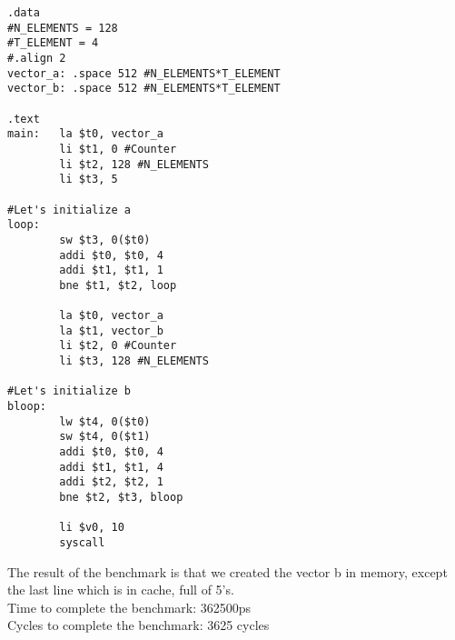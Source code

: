 \documentclass{article}
\begin{document}
\begin{lstlisting} 
.data
#N_ELEMENTS = 128
#T_ELEMENT = 4
#.align 2
vector_a: .space 512 #N_ELEMENTS*T_ELEMENT
vector_b: .space 512 #N_ELEMENTS*T_ELEMENT

.text
main: 	la $t0, vector_a
		li $t1, 0 #Counter
		li $t2, 128 #N_ELEMENTS
		li $t3, 5

#Let's initialize a
loop:	
		sw $t3, 0($t0)
		addi $t0, $t0, 4
		addi $t1, $t1, 1
		bne $t1, $t2, loop

        la $t0, vector_a
		la $t1, vector_b
		li $t2, 0 #Counter
		li $t3, 128 #N_ELEMENTS

#Let's initialize b
bloop:	
		lw $t4, 0($t0)
		sw $t4, 0($t1)
		addi $t0, $t0, 4
		addi $t1, $t1, 4
		addi $t2, $t2, 1
		bne $t2, $t3, bloop

        li $v0, 10
		syscall
\end{lstlisting}
The result of the benchmark is that we created the vector b in memory, except the last line which is in cache, full of 5's.\\
Time to complete the benchmark: 362500ps\\
Cycles to complete the benchmark: 3625 cycles
\end{document}
